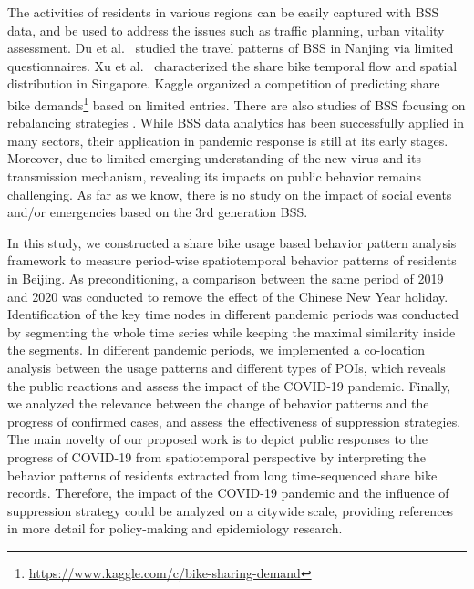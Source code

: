 \documentclass[ijgi,submit,moreauthors,pdftex]{Definitions/mdpi}
\begin{document}
The activities of residents in various regions can be easily captured with BSS data, and be used to address the issues such as traffic planning, urban vitality assessment.
Du et al.\ \cite{du2018better} studied the travel patterns of BSS in Nanjing via limited questionnaires.
Xu et al.\ \cite{xu2019unravel} characterized the share bike temporal flow and spatial distribution in Singapore.
Kaggle organized a competition of predicting share bike demands\footnote{\url{https://www.kaggle.com/c/bike-sharing-demand}} based on limited entries.
There are also studies of BSS focusing on rebalancing strategies \cite{pal2017free, ai2019deep,chen2016dynamic}.
While BSS data analytics has been successfully applied in many sectors, their application in pandemic response is still at its early stages.
Moreover, due to limited emerging understanding of the new virus and its transmission mechanism, revealing its impacts on public behavior remains challenging.
As far as we know, there is no study on the impact of social events and/or emergencies based on the 3rd generation BSS.

In this study, we constructed a share bike usage based behavior pattern analysis framework to measure period-wise spatiotemporal behavior patterns of residents in Beijing. 
As preconditioning, a comparison between the same period of 2019 and 2020 was conducted to remove the effect of the Chinese New Year holiday. 
Identification of the key time nodes in different pandemic periods was conducted by segmenting the whole time series while keeping the maximal similarity inside the segments.
In different pandemic periods, we implemented a co-location analysis between the usage patterns and different types of POIs, which reveals the public reactions and assess the impact of the COVID-19 pandemic.
Finally, we analyzed the relevance between the change of behavior patterns and the progress of confirmed cases, and assess the effectiveness of suppression strategies.
The main novelty of our proposed work is to depict public responses to the progress of COVID-19 from spatiotemporal perspective by interpreting the behavior patterns of residents extracted from long time-sequenced share bike records. 
Therefore, the impact of the COVID-19 pandemic and the influence of suppression strategy could be analyzed on a citywide scale, providing references in more detail for policy-making and epidemiology research. 
\end{document}
